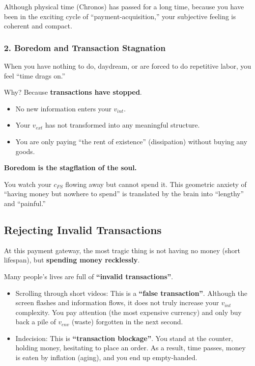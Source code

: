 Although physical time (Chronos) has passed for a long time, because you have been in the exciting cycle of ``payment-acquisition,'' your subjective feeling is coherent and compact.

\subsubsection{2. Boredom and Transaction Stagnation}

When you have nothing to do, daydream, or are forced to do repetitive labor, you feel ``time drags on.''

Why? Because \textbf{transactions have stopped}.

\begin{itemize}
\item No new information enters your $v_{int}$.

\item Your $v_{ext}$ has not transformed into any meaningful structure.

\item You are only paying ``the rent of existence'' (dissipation) without buying any goods.
\end{itemize}

\textbf{Boredom is the stagflation of the soul.}

You watch your $c_{FS}$ flowing away but cannot spend it. This geometric anxiety of ``having money but nowhere to spend'' is translated by the brain into ``lengthy'' and ``painful.''

\subsection{Rejecting Invalid Transactions}

At this payment gateway, the most tragic thing is not having no money (short lifespan), but \textbf{spending money recklessly}.

Many people's lives are full of \textbf{``invalid transactions''}.

\begin{itemize}
\item Scrolling through short videos: This is a \textbf{``false transaction''}. Although the screen flashes and information flows, it does not truly increase your $v_{int}$ complexity. You pay attention (the most expensive currency) and only buy back a pile of $v_{env}$ (waste) forgotten in the next second.

\item Indecision: This is \textbf{``transaction blockage''}. You stand at the counter, holding money, hesitating to place an order. As a result, time passes, money is eaten by inflation (aging), and you end up empty-handed.
\end{itemize}


